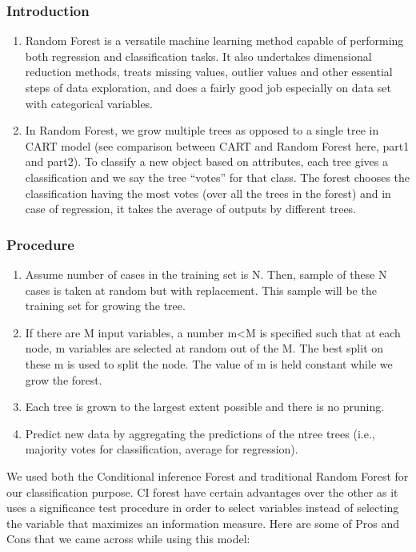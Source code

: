 \subsubsection{Introduction}
\begin{enumerate}

\item Random Forest is a versatile machine learning method capable of performing both regression and classification tasks. It also undertakes dimensional reduction methods, treats missing values, outlier values and other essential steps of data exploration, and does a fairly good job especially on data set with categorical variables.

\item In Random Forest, we grow multiple trees as opposed to a single tree in CART model (see comparison between CART and Random Forest here, part1 and part2). To classify a new object based on attributes, each tree gives a classification and we say the tree “votes” for that class. The forest chooses the classification having the most votes (over all the trees in the forest) and in case of regression, it takes the average of outputs by different trees.
\end{enumerate}

\subsubsection{Procedure}
\begin{enumerate}

\item Assume number of cases in the training set is N. Then, sample of these N cases is taken at random but with replacement. This sample will be the training set for growing the tree.

\item If there are M input variables, a number m<M is specified such that at each node, m variables are selected at random out of the M. The best split on these m is used to split the node. The value of m is held constant while we grow the forest.

\item Each tree is grown to the largest extent possible and there is no pruning.

\item Predict new data by aggregating the predictions of the ntree trees (i.e., majority votes for classification, average for regression).
\end{enumerate}
We used both the Conditional inference Forest and traditional Random Forest for our classification purpose. CI forest have certain advantages over the other as it uses a significance test procedure in order to select variables instead of selecting the variable that maximizes an information measure.
Here are some of Pros and Cons that we came across while using this model:

